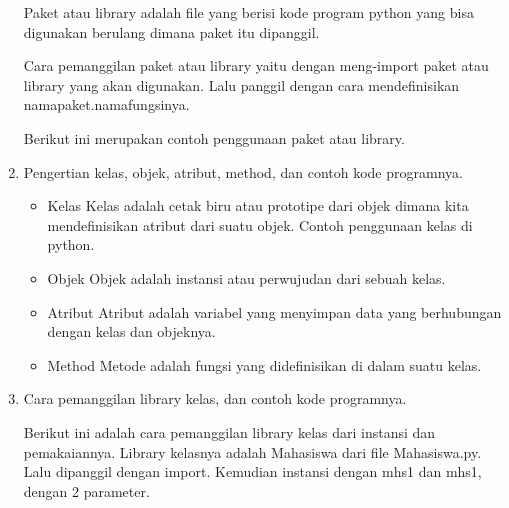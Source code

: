 \begin{enumerate}
	Paket atau library adalah file yang berisi kode program python yang bisa digunakan berulang dimana paket itu dipanggil.
	
	Cara pemanggilan paket atau library yaitu dengan meng-import paket atau library yang akan digunakan. Lalu panggil dengan cara mendefinisikan namapaket.namafungsinya.
	
	Berikut ini merupakan contoh penggunaan paket atau library.
	
	
	\item Pengertian kelas, objek, atribut, method, dan contoh kode programnya.
	
	\begin{itemize}
		\item Kelas
		Kelas adalah cetak biru atau prototipe dari objek dimana kita mendefinisikan atribut dari suatu objek.
		Contoh penggunaan kelas di python.
		
		
		\item Objek
		Objek adalah instansi atau perwujudan dari sebuah kelas.
		
		
		\item Atribut
		Atribut adalah variabel yang menyimpan data yang berhubungan dengan kelas dan objeknya.
		
		
		\item Method
		Metode adalah fungsi yang didefinisikan di dalam suatu kelas.
		
		
	\end{itemize}
	
	\item Cara pemanggilan library kelas, dan contoh kode programnya.
	
	Berikut ini adalah cara pemanggilan library kelas dari instansi dan pemakaiannya. Library kelasnya adalah Mahasiswa dari file Mahasiswa.py. Lalu dipanggil dengan import. Kemudian instansi dengan mhs1 dan mhs1, dengan 2 parameter.
	
	

\end{enumerate}
